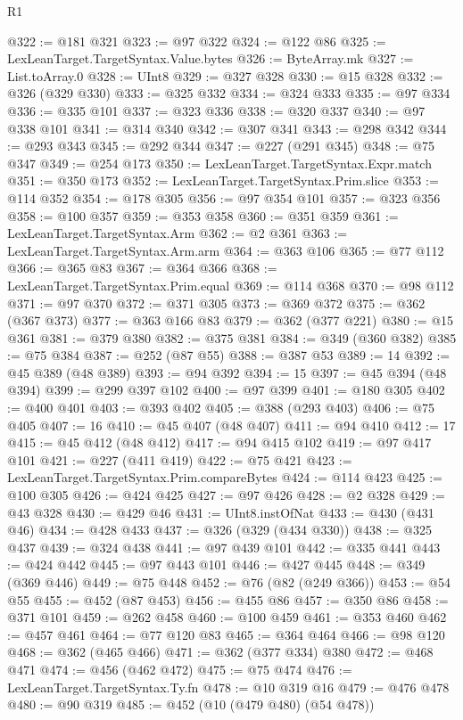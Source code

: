 \begin{lexlean}{R1}
\begin{coremodule}
@322 := @181 @321
@323 := @97 @322
@324 := @122 @86
@325 := LexLeanTarget.TargetSyntax.Value.bytes
@326 := ByteArray.mk
@327 := List.toArray.{0}
@328 := UInt8
@329 := @327 @328
@330 := @15 @328
@332 := @326 (@329 @330)
@333 := @325 @332
@334 := @324 @333
@335 := @97 @334
@336 := @335 @101
@337 := @323 @336
@338 := @320 @337
@340 := @97 @338 @101
@341 := @314 @340
@342 := @307 @341
@343 := @298 @342
@344 := @293 @343
@345 := @292 @344
@347 := @227 (@291 @345)
@348 := @75 @347
@349 := @254 @173
@350 := LexLeanTarget.TargetSyntax.Expr.match
@351 := @350 @173
@352 := LexLeanTarget.TargetSyntax.Prim.slice
@353 := @114 @352
@354 := @178 @305
@356 := @97 @354 @101
@357 := @323 @356
@358 := @100 @357
@359 := @353 @358
@360 := @351 @359
@361 := LexLeanTarget.TargetSyntax.Arm
@362 := @2 @361
@363 := LexLeanTarget.TargetSyntax.Arm.arm
@364 := @363 @106
@365 := @77 @112
@366 := @365 @83
@367 := @364 @366
@368 := LexLeanTarget.TargetSyntax.Prim.equal
@369 := @114 @368
@370 := @98 @112
@371 := @97 @370
@372 := @371 @305
@373 := @369 @372
@375 := @362 (@367 @373)
@377 := @363 @166 @83
@379 := @362 (@377 @221)
@380 := @15 @361
@381 := @379 @380
@382 := @375 @381
@384 := @349 (@360 @382)
@385 := @75 @384
@387 := @252 (@87 @55)
@388 := @387 @53
@389 := 14
@392 := @45 @389 (@48 @389)
@393 := @94 @392
@394 := 15
@397 := @45 @394 (@48 @394)
@399 := @299 @397 @102
@400 := @97 @399
@401 := @180 @305
@402 := @400 @401
@403 := @393 @402
@405 := @388 (@293 @403)
@406 := @75 @405
@407 := 16
@410 := @45 @407 (@48 @407)
@411 := @94 @410
@412 := 17
@415 := @45 @412 (@48 @412)
@417 := @94 @415 @102
@419 := @97 @417 @101
@421 := @227 (@411 @419)
@422 := @75 @421
@423 := LexLeanTarget.TargetSyntax.Prim.compareBytes
@424 := @114 @423
@425 := @100 @305
@426 := @424 @425
@427 := @97 @426
@428 := @2 @328
@429 := @43 @328
@430 := @429 @46
@431 := UInt8.instOfNat
@433 := @430 (@431 @46)
@434 := @428 @433
@437 := @326 (@329 (@434 @330))
@438 := @325 @437
@439 := @324 @438
@441 := @97 @439 @101
@442 := @335 @441
@443 := @424 @442
@445 := @97 @443 @101
@446 := @427 @445
@448 := @349 (@369 @446)
@449 := @75 @448
@452 := @76 (@82 (@249 @366))
@453 := @54 @55
@455 := @452 (@87 @453)
@456 := @455 @86
@457 := @350 @86
@458 := @371 @101
@459 := @262 @458
@460 := @100 @459
@461 := @353 @460
@462 := @457 @461
@464 := @77 @120 @83
@465 := @364 @464
@466 := @98 @120
@468 := @362 (@465 @466)
@471 := @362 (@377 @334) @380
@472 := @468 @471
@474 := @456 (@462 @472)
@475 := @75 @474
@476 := LexLeanTarget.TargetSyntax.Ty.fn
@478 := @10 @319 @16
@479 := @476 @478
@480 := @90 @319
@485 := @452 (@10 (@479 @480) (@54 @478))

\end{coremodule}
\end{lexlean}
